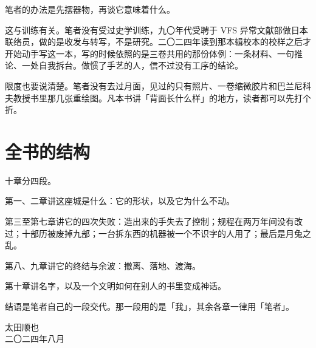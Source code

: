 笔者的办法是先摆器物，再谈它意味着什么。

这与训练有关。笔者没有受过史学训练，九〇年代受聘于 VFS 异常文献部做日本联络员，做的是收发与转写，不是研究。二〇二四年读到那本辑校本的校样之后才开始动手写这一本，写的时候依照的是三卷共用的那份体例：一条材料、一句推论、一处自我拆台。做惯了手艺的人，信不过没有工序的结论。

限度也要说清楚。笔者没有去过月面，见过的只有照片、一卷缩微胶片和巴兰尼科夫教授书里那几张重绘图。凡本书讲「背面长什么样」的地方，读者都可以先打个折。

\section*{全书的结构}

十章分四段。

第一、二章讲这座城是什么：它的形状，以及它为什么不动。

第三至第七章讲它的四次失败：造出来的手失去了控制；规程在两万年间没有改过；十部历被废掉九部；一台拆东西的机器被一个不识字的人用了；最后是月兔之乱。

第八、九章讲它的终结与余波：撤离、落地、渡海。

第十章讲名字，以及一个文明如何在别人的书里变成神话。

结语是笔者自己的一段交代。那一段用的是「我」，其余各章一律用「笔者」。

\begin{flushright}
{\small 太田顺也}\\[1mm]
{\footnotesize\color{pencil} 二〇二四年八月}
\end{flushright}

\clearpage

